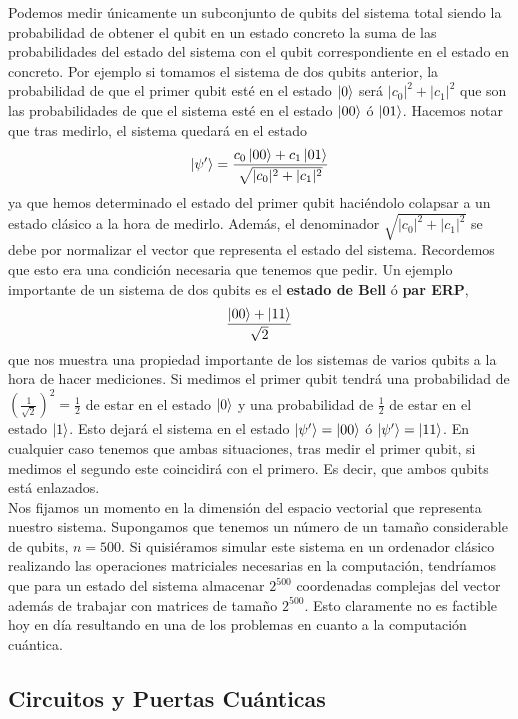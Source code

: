 \documentclass[a4paper]{article}
\numberwithin{equation}{section}
\begin{document}
Podemos medir únicamente un subconjunto de qubits del sistema total siendo la probabilidad de obtener el qubit en un estado concreto la suma de las probabilidades del estado del sistema con el qubit correspondiente en el estado en concreto. Por ejemplo si tomamos el sistema de dos qubits anterior, la probabilidad de que el primer qubit esté en el estado $\ket{0}$ será $|c_0|^2 + |c_1|^2$ que son las probabilidades de que el sistema esté en el estado $\ket{00}$ ó $\ket{01}$. Hacemos notar que tras medirlo, el sistema quedará en el estado
\begin{equation}
\ket{\psi'} = \frac{c_0\ket{00} + c_1\ket{01}}{\sqrt{|c_0|^2 + |c_1|^2}}
\end{equation}
ya que hemos determinado el estado del primer qubit haciéndolo colapsar a un estado clásico a la hora de medirlo. Además, el denominador $\sqrt{|c_0|^2 + |c_1|^2}$ se debe por normalizar el vector que representa el estado del sistema. Recordemos que esto era una condición necesaria que tenemos que pedir.
Un ejemplo importante de un sistema de dos qubits es el \textbf{estado de Bell} ó \textbf{par ERP},
\begin{equation}
\frac{\ket{00} + \ket{11}}{\sqrt{2}}
\end{equation}
que nos muestra una propiedad importante de los sistemas de varios qubits a la hora de hacer mediciones. Si medimos el primer qubit tendrá una probabilidad de $(\frac{1}{\sqrt{2}})^2 = \frac{1}{2}$ de estar en el estado $\ket{0}$ y una probabilidad de $\frac{1}{2}$ de estar en el estado $\ket{1}$. Esto dejará el sistema en el estado $\ket{\psi'} = \ket{00}$ ó $\ket{\psi'} = \ket{11}$. En cualquier caso tenemos que ambas situaciones, tras medir el primer qubit, si medimos el segundo este coincidirá con el primero. Es decir, que ambos qubits está enlazados.\\
\linebreak
Nos fijamos un momento en la dimensión del espacio vectorial que representa nuestro sistema. Supongamos que tenemos un número de un tamaño considerable de qubits, $n=500$. Si quisiéramos simular este sistema en un ordenador clásico realizando las operaciones matriciales necesarias en la computación, tendríamos que para un estado del sistema almacenar $2^{500}$ coordenadas complejas del vector además de trabajar con matrices de tamaño $2^{500}$. Esto claramente no es factible hoy en día resultando en una de los problemas en cuanto a la computación cuántica.

\subsection{Circuitos y Puertas Cuánticas}
\end{document}
